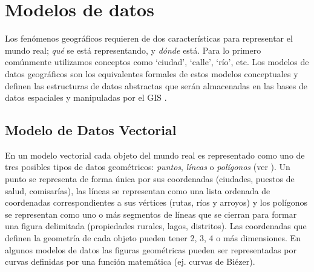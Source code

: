 
%	


\section{Modelos de datos}

Los fenómenos geográficos requieren de dos características para representar el mundo real; \emph{qué} se está representando, y \emph{dónde} está. Para lo primero comúnmente utilizamos conceptos como `ciudad', `calle', `río', etc. Los modelos de datos geográficos son los equivalentes formales de estos modelos conceptuales y definen las estructuras de datos abstractas que serán almacenadas en las bases de datos espaciales y manipuladas por el GIS \citep{burrough1998principles}.

\subsection{Modelo de Datos Vectorial}

En un modelo vectorial cada objeto del mundo real es representado como uno de tres posibles tipos de datos geométricos: \emph{puntos}, \emph{líneas} o \emph{polígonos} (ver ). Un punto se representa de forma única por sus coordenadas (ciudades, puestos de salud, comisarías), las líneas se representan como una lista ordenada de coordenadas correspondientes a sus vértices (rutas, ríos y arroyos) y los polígonos se representan como uno o más segmentos de líneas que se cierran para formar una figura delimitada (propiedades rurales, lagos, distritos). Las coordenadas que definen la geometría de cada objeto pueden tener 2, 3, 4 o más dimensiones. En algunos modelos de datos las figuras geométricas pueden ser representadas por curvas definidas por una función matemática (ej. curvas de Biézer).

